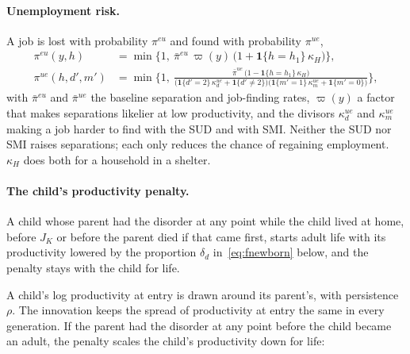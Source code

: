 \documentclass[10pt]{article}
\begin{document}
\paragraph{Unemployment risk.} A job is lost with probability $\pi^{eu}$ and found
with probability $\pi^{ue}$,
\begin{equation}\label{eq:femp}
\begin{aligned}
\pi^{eu}(y,h)&=\min\Big\{1,\ \bar\pi^{eu}\,\varpi(y)\,
\big(1+\mathbf{1}\{h=h_1\}\,\kappa_{H}\big)\Big\},\\
\pi^{ue}(h,d',m')&=\min\Big\{1,\ \frac{\bar\pi^{ue}\,\big(1-\mathbf{1}\{h=h_1\}\,\kappa_{H}\big)}
{\big(\mathbf{1}\{d'=2\}\,\kappa^{ue}_{d}+\mathbf{1}\{d'\neq2\}\big)\big(\mathbf{1}\{m'=1\}\,\kappa^{ue}_{m}+\mathbf{1}\{m'=0\}\big)}\Big\},
\end{aligned}
\end{equation}
with $\bar\pi^{eu}$ and $\bar\pi^{ue}$ the baseline separation and job-finding rates,
$\varpi(y)$ a factor that makes separations likelier at low productivity, and the divisors
$\kappa^{ue}_{d}$ and $\kappa^{ue}_{m}$ making a job harder to find with the SUD and with
SMI. Neither the SUD nor SMI raises separations; each only reduces the chance of regaining employment. $\kappa_{H}$ does both for a household in a
shelter.

\paragraph{The child's productivity penalty.} A child whose parent had the disorder at any point while the child lived at home,
before $J_K$ or before the parent died if that came first, starts adult life with its productivity lowered
by the proportion $\delta_d$ in~\eqref{eq:fnewborn} below, and the penalty stays with the
child for life.

A child's log productivity at entry is drawn around its parent's, with persistence $\rho$. The innovation keeps the spread of productivity at entry the same in every generation. If the parent had the disorder at any point before the child became an adult, the penalty scales the child's productivity down for life:
\end{document}
